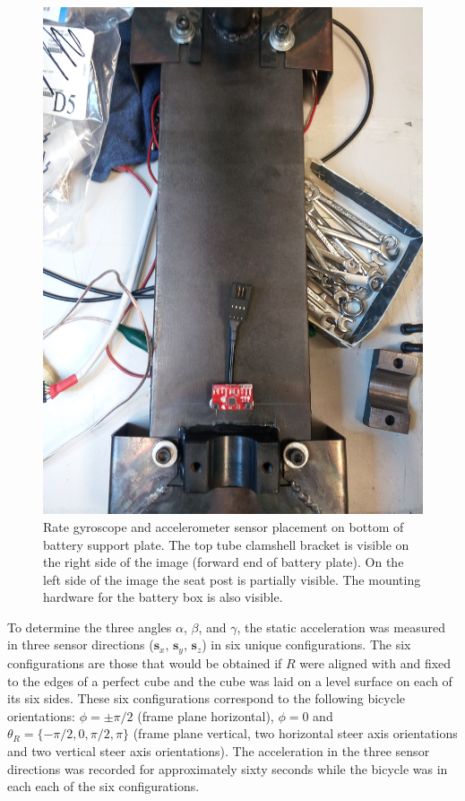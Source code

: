 \begin{figure}[ht]
  \centering
  \includegraphics[width=.6\textwidth,angle=90]{images/IMG_20130325_195226.jpg}
  \caption{Rate gyroscope and accelerometer sensor placement on bottom of
  battery support plate. The top tube clamshell bracket is visible on the right side of
the image (forward end of battery plate). On the left side of the image the
seat post is partially visible. The mounting hardware for the battery box is also
visible.}
  \label{rb:img:imuplacement}
\end{figure}

To determine the three angles $\alpha$, $\beta$, and $\gamma$, the static
acceleration was measured in three sensor directions ($\bm{s}_x$, $\bm{s}_y$,
$\bm{s}_z$) in six unique configurations. The six configurations are those that
would be obtained if $R$ were aligned with and fixed to the edges of a perfect
cube and the cube was laid on a level surface on each of its six sides.  These
six configurations correspond to the following bicycle orientations:
$\phi=\pm\pi/2$ (frame plane horizontal), $\phi=0$ and $\theta_R = \{-\pi/2, 0,
\pi/2, \pi\}$ (frame plane vertical, two horizontal steer axis orientations and
two vertical steer axis orientations). The acceleration in the three sensor
directions was recorded for approximately sixty seconds while the bicycle was
in each each of the six configurations.


